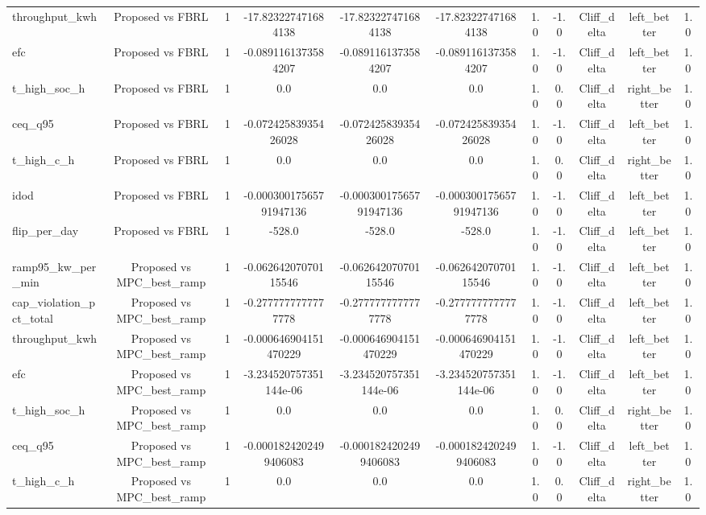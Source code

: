 \begin{table}[t]
\begin{tabular}{lcccccccccc}
throughput\_kwh & Proposed vs FBRL & 1 & -17.823227471684138 & -17.823227471684138 & -17.823227471684138 & 1.0 & -1.0 & Cliff\_delta & left\_better & 1.0 \\
efc & Proposed vs FBRL & 1 & -0.0891161373584207 & -0.0891161373584207 & -0.0891161373584207 & 1.0 & -1.0 & Cliff\_delta & left\_better & 1.0 \\
t\_high\_soc\_h & Proposed vs FBRL & 1 & 0.0 & 0.0 & 0.0 & 1.0 & 0.0 & Cliff\_delta & right\_better & 1.0 \\
ceq\_q95 & Proposed vs FBRL & 1 & -0.07242583935426028 & -0.07242583935426028 & -0.07242583935426028 & 1.0 & -1.0 & Cliff\_delta & left\_better & 1.0 \\
t\_high\_c\_h & Proposed vs FBRL & 1 & 0.0 & 0.0 & 0.0 & 1.0 & 0.0 & Cliff\_delta & right\_better & 1.0 \\
idod & Proposed vs FBRL & 1 & -0.00030017565791947136 & -0.00030017565791947136 & -0.00030017565791947136 & 1.0 & -1.0 & Cliff\_delta & left\_better & 1.0 \\
flip\_per\_day & Proposed vs FBRL & 1 & -528.0 & -528.0 & -528.0 & 1.0 & -1.0 & Cliff\_delta & left\_better & 1.0 \\
ramp95\_kw\_per\_min & Proposed vs MPC\_best\_ramp & 1 & -0.06264207070115546 & -0.06264207070115546 & -0.06264207070115546 & 1.0 & -1.0 & Cliff\_delta & left\_better & 1.0 \\
cap\_violation\_pct\_total & Proposed vs MPC\_best\_ramp & 1 & -0.2777777777777778 & -0.2777777777777778 & -0.2777777777777778 & 1.0 & -1.0 & Cliff\_delta & left\_better & 1.0 \\
throughput\_kwh & Proposed vs MPC\_best\_ramp & 1 & -0.000646904151470229 & -0.000646904151470229 & -0.000646904151470229 & 1.0 & -1.0 & Cliff\_delta & left\_better & 1.0 \\
efc & Proposed vs MPC\_best\_ramp & 1 & -3.234520757351144e-06 & -3.234520757351144e-06 & -3.234520757351144e-06 & 1.0 & -1.0 & Cliff\_delta & left\_better & 1.0 \\
t\_high\_soc\_h & Proposed vs MPC\_best\_ramp & 1 & 0.0 & 0.0 & 0.0 & 1.0 & 0.0 & Cliff\_delta & right\_better & 1.0 \\
ceq\_q95 & Proposed vs MPC\_best\_ramp & 1 & -0.0001824202499406083 & -0.0001824202499406083 & -0.0001824202499406083 & 1.0 & -1.0 & Cliff\_delta & left\_better & 1.0 \\
t\_high\_c\_h & Proposed vs MPC\_best\_ramp & 1 & 0.0 & 0.0 & 0.0 & 1.0 & 0.0 & Cliff\_delta & right\_better & 1.0 \\

\end{tabular}
\end{table}
